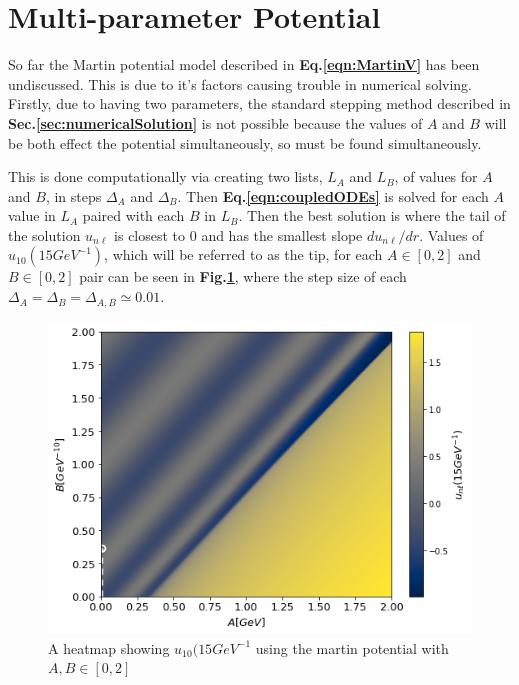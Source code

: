 \documentclass[10pt,twocolumn]{revtex4}    %
\begin{document}
\section{Multi-parameter Potential}\label{sec:Multi-parameterPotential}

So far the Martin potential model described in  \textbf{Eq.\ref{eqn:MartinV}} has been undiscussed. This is due to it's factors causing trouble in numerical solving. 
Firstly, due to having two parameters, the standard stepping method described in \textbf{Sec.\ref{sec:numericalSolution}} is not possible because the values of $A$ and $B$ will be both effect the potential simultaneously, so must be found simultaneously.

This is done computationally via creating two lists, $L_A$ and $L_B$, of values for $A$ and $B$, in steps $\Delta_A$ and $\Delta_B$. Then \textbf{Eq.\ref{eqn:coupledODEs}} is solved for each $A$ value in $L_A$ paired with each $B$ in $L_B$. Then the best solution is where the tail of the solution $u_{n\ell}$ is closest to $0$ and has the smallest slope $du_{n\ell}/dr$.
Values of $u_{10}(15GeV^{-1})$, which will be referred to as the tip, for each $A \in [0,2]$ and $B \in [0,2]$ pair can be seen in \textbf{Fig.\ref{fig:martinHeatmap}}, where the step size of each $\Delta_A = \Delta_B = \Delta_{A,B} \simeq 0.01$.

\begin{figure}[t]
    \centering
    \includegraphics[width=\linewidth]{MartinHeatmap.png}
    \caption{A heatmap showing $u_{10}(15GeV^{-1}$ using the martin potential with $A,B \in [0,2]$}
    \label{fig:martinHeatmap}
\end{figure}
\end{document}
